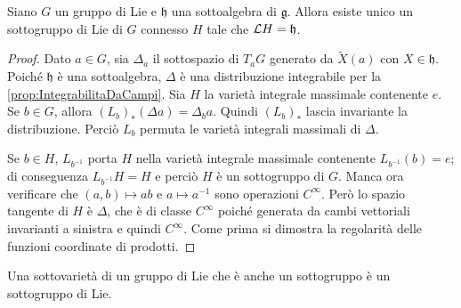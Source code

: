 \begin{theorem}
	Siano $G$ un gruppo di Lie e $\mathfrak h$ una sottoalgebra di $\mathfrak g$. Allora esiste unico un sottogruppo di Lie di $G$ connesso $H$ tale che $\mathcal L H = \mathfrak h$.
\end{theorem}
\begin{proof}
	Dato $a \in G$, sia $\Delta_a$ il sottospazio di $T_aG$ generato da $\tilde X(a)$ con $X\in \mathfrak h$.
	Poiché $\mathfrak h$ è una sottoalgebra, $\Delta$ è una distribuzione integrabile per la \cref{prop:IntegrabilitaDaCampi}.
	Sia $H$ la varietà integrale massimale contenente $e$. Se $b \in G$, allora $(L_b)_* (\Delta a) = \Delta_b a$. Quindi $(L_b)_*$ lascia invariante la distribuzione. Perciò $L_b$ permuta le varietà integrali massimali di $\Delta$.
	
	Se $b\in H$, $L_{b^{-1}}$ porta $H$ nella varietà integrale massimale contenente $L_{b^{-1}} (b) =e$; di conseguenza $L_{b^{-1}} H = H$ e perciò $H$ è un sottogruppo di $G$.
	Manca ora verificare che $(a,b) \mapsto ab$ e $a\mapsto a^{-1}$ sono operazioni $C^\infty$.
	Però lo spazio tangente di $H$ è $\Delta$, che è di classe $C^\infty$ poiché generata da cambi vettoriali invarianti a sinistra e quindi $C^\infty$.
	Come prima si dimostra la regolarità delle funzioni coordinate di prodotti.
\end{proof}

\begin{remark}
	Una sottovarietà di un gruppo di Lie che è anche un sottogruppo è un sottogruppo di Lie.
\end{remark}










































